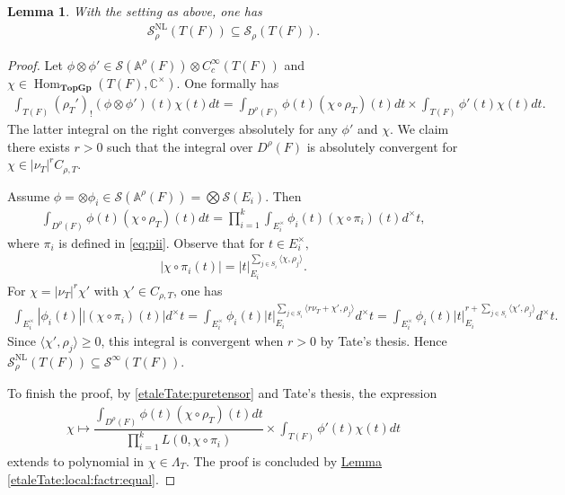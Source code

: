 \documentclass[10pt]{amsart}
\newtheorem{lemma}[theorem]{Lemma}
\theoremstyle{definition}
\numberwithin{equation}{section}
\DeclareMathOperator{\Hom}{\mathrm{Hom}}
\numberwithin{equation}{subsection}
\begin{document}
\begin{lemma}\label{SNL:in:Srho} With the setting as above, one has
\begin{align*}
\mathcal{S}^{\mathrm{NL}}_\rho(T(F))\subseteq\mathcal{S}_\rho(T(F)).
\end{align*}
\end{lemma}
\begin{proof} 
Let $\phi\otimes \phi'\in \mathcal{S}(\mathbb{A}^\rho(F))\otimes C^\infty_c(T(F))$ and $\chi\in\Hom_{\mathbf{TopGp}}(T(F),\mathbb{C}^\times).$ One formally has
\begin{align}\label{etaleTate:zeta:decomp}
    \int_{T(F)} (\rho_T')_!(\phi \otimes \phi')(t) \chi(t) dt = \int_{D^\rho(F)} \phi(t)(\chi\circ\rho_T)(t)dt \times \int_{T(F)} \phi'(t)\chi(t) dt.
\end{align}
The latter integral on the right converges absolutely for any $\phi'$ and $\chi$. We claim there exists $r>0$ such that the integral over $D^\rho(F)$ is absolutely convergent for $\chi\in |\nu_T|^rC_{\rho,T}$. 



Assume $\phi=\otimes\phi_i\in\mathcal{S}(\mathbb{A}^\rho(F)) = \bigotimes\mathcal{S}(E_i)$. Then
\begin{align}\label{etaleTate:puretensor}
    \int_{D^\rho(F)} \phi(t)(\chi\circ\rho_T)(t) dt = \prod_{i=1}^k \int_{E_i^\times} \phi_i(t)(\chi\circ \pi_i)(t) d^\times t,
\end{align}
where $\pi_i$ is defined in \eqref{eq:pii}. Observe that for $t\in E_i^\times,$ 
\begin{align*}
    |\chi\circ \pi_i (t)| = |t|_{E_i}^{\sum_{j\in S_i}\langle\chi,\rho_j\rangle}.
\end{align*}
For $\chi = |\nu_T|^r\chi'$ with $\chi'\in C_{\rho,T}$, one has
\begin{align*}
    \int_{E_i^\times} |\phi_i(t)||(\chi\circ \pi_i)(t)| d^\times t = \int_{E_i^\times} \phi_i(t) |t|_{E_i}^{\sum_{j\in S_i}\langle r\nu_T + \chi',\rho_j\rangle} d^\times t = \int_{E_i^\times} \phi_i(t) |t|_{E_i}^{r + \sum_{j\in S_i}\langle\chi',\rho_j\rangle} d^\times t.
\end{align*}
Since $\langle\chi',\rho_j\rangle\geq 0$, this integral is convergent when $r>0$ by Tate's thesis. Hence $\mathcal{S}^{\mathrm{NL}}_\rho(T(F))\subseteq \mathcal{S}^\infty(T(F))$.

To finish the proof, by \eqref{etaleTate:puretensor} and Tate's thesis, the expression
\begin{align*}
    \chi\mapsto \dfrac{\displaystyle\int_{D^\rho(F)} \phi(t)(\chi\circ\rho_T)(t) dt}{\prod\limits_{i=1}^k L(0,\chi\circ \pi_i)}\times \int_{T(F)} \phi'(t)\chi(t) dt
\end{align*}
extends to polynomial in $\chi\in\Lambda_T$. The proof is concluded by \hyperref[etaleTate:local:factr:equal]{Lemma \ref{etaleTate:local:factr:equal}}. 
\end{proof}
\end{document}
